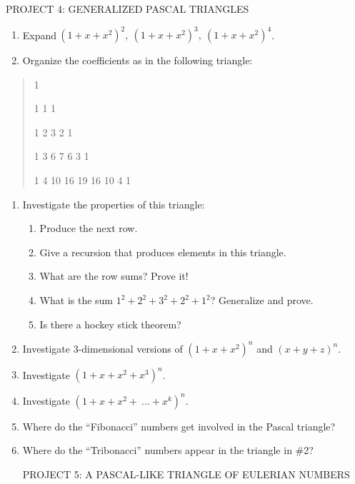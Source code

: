 PROJECT 4: GENERALIZED PASCAL TRIANGLES
\begin{enumerate}
\def\labelenumi{\arabic{enumi}.}

\item
  Expand\({\ \left( 1 + x + x^{2} \right)}^{2},\ \left( 1 + x + x^{2} \right)^{3},\ \left( 1 + x + x^{2} \right)^{4}\).
\item
  Organize the coefficients as in the following triangle:

\end{enumerate}
\begin{quote}
1

1 1 1

1 2 3 2 1

1 3 6 7 6 3 1

1 4 10 16 19 16 10 4 1

\end{quote}
\begin{enumerate}
\def\labelenumi{\arabic{enumi}.}

\item
  Investigate the properties of this triangle:
\begin{enumerate}
  \def\labelenumii{\alph{enumii}.}

  \item
    Produce the next row.
  \item
    Give a recursion that produces elements in this triangle.
  \item
    What are the row sums? Prove it!
  \item
    What is the sum \(1^{2} + 2^{2} + 3^{2} + 2^{2} + 1^{2}\)?
    Generalize and prove.
  \item
    Is there a hockey stick theorem?

\end{enumerate}
\item
  Investigate 3-dimensional versions of
  \(\left( 1 + x + x^{2} \right)^{n}\) and
  \(\left( x + y + z \right)^{n}.\)
\item
  Investigate \(\left( 1 + x + x^{2} + x^{3} \right)^{n}\).
\item
  Investigate \(\left( 1 + x + x^{2} + \ \ldots + x^{k} \right)^{n}\).
\item
  Where do the ``Fibonacci'' numbers get involved in the Pascal
  triangle?
\item
  Where do the ``Tribonacci'' numbers appear in the triangle in \#2?

PROJECT 5: A PASCAL-LIKE TRIANGLE OF EULERIAN NUMBERS

\end{enumerate}
